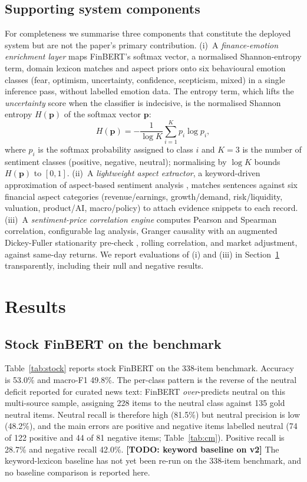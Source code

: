 \documentclass{aims}
\numberwithin{equation}{section}
\begin{document}
\subsection{Supporting system components}\label{sec:supporting}
For completeness we summarise three components that constitute the deployed system
but are not the paper's primary contribution. (i)~A \emph{finance-emotion enrichment
layer} maps FinBERT's softmax vector, a normalised Shannon-entropy term, domain
lexicon matches and aspect priors onto six behavioural emotion classes (fear,
optimism, uncertainty, confidence, scepticism, mixed) in a single inference pass,
without labelled emotion data. The entropy term, which lifts the
\emph{uncertainty} score when the classifier is indecisive, is the normalised
Shannon entropy $H(\mathbf{p})$ of the softmax vector $\mathbf{p}$:
\begin{equation*}
H(\mathbf{p}) = -\frac{1}{\log K}\sum_{i=1}^{K} p_i \log p_i,
\end{equation*}
where $p_i$ is the softmax probability assigned to class $i$ and $K = 3$ is the
number of sentiment classes (positive, negative, neutral); normalising by $\log K$
bounds $H(\mathbf{p})$ to $[0,1]$.
(ii)~A \emph{lightweight aspect extractor}, a keyword-driven approximation of
aspect-based sentiment analysis \citep{pontiki2014}, matches sentences against six
financial aspect categories (revenue/earnings, growth/demand, risk/liquidity,
valuation, product/AI, macro/policy) to attach evidence snippets to each record. (iii)~A
\emph{sentiment-price correlation engine} computes Pearson and Spearman
correlation, configurable lag analysis, Granger causality \citep{granger1969} with
an augmented Dickey-Fuller stationarity pre-check \citep{dickey1979}, rolling
correlation, and market adjustment, against same-day returns. We report evaluations
of (i) and (iii) in Section~\ref{sec:results} transparently, including their null
and negative results.

\section{Results}\label{sec:results}
\subsection{Stock FinBERT on the benchmark}
Table~\ref{tab:stock} reports stock FinBERT on the 338-item benchmark. Accuracy is
53.0\% and macro-F1 49.8\%. The per-class pattern is the reverse of the neutral
deficit reported for curated news text: FinBERT \emph{over}-predicts neutral on this
multi-source sample, assigning 228 items to the neutral class against 135 gold
neutral items. Neutral recall is therefore high (81.5\%) but neutral precision is
low (48.2\%), and the main errors are positive and negative items labelled neutral
(74 of 122 positive and 44 of 81 negative items; Table~\ref{tab:cm}). Positive
recall is 28.7\% and negative recall 42.0\%.
\textbf{[TODO: keyword baseline on v2]} The keyword-lexicon baseline has not yet been
re-run on the 338-item benchmark, and no baseline comparison is reported here.
\end{document}
